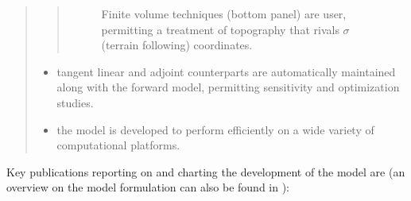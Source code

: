 \documentclass[letterpaper,10pt,english]{sphinxmanual}
\begin{document}
\begin{quote}
\begin{itemize}
\end{itemize}
\begin{quote}
\begin{figure}[htbp]
\centering
\capstart

\noindent{}
\caption{Finite volume techniques (bottom panel) are user, permitting a treatment of topography that rivals \(\sigma\) (terrain following) coordinates.}\label{\detokenize{overview/overview:fvol}}\end{figure}
\end{quote}
\begin{itemize}
\item {} 
tangent linear and adjoint counterparts are automatically maintained along with the forward model, permitting sensitivity and optimization studies.

\item {} 
the model is developed to perform efficiently on a wide variety of computational platforms.

\end{itemize}
\end{quote}

Key publications reporting on and charting the development of the model are \label{\detokenize{overview/overview:id1}}{\hyperref[\detokenize{zreferences:hill-95}]{\sphinxcrossref{{[}HM95{]}}}}\label{\detokenize{overview/overview:id2}}{\hyperref[\detokenize{zreferences:marshall-97a}]{\sphinxcrossref{{[}MHPA97{]}}}}\label{\detokenize{overview/overview:id3}}{\hyperref[\detokenize{zreferences:marshall-97b}]{\sphinxcrossref{{[}MAH+97{]}}}}\label{\detokenize{overview/overview:id4}}{\hyperref[\detokenize{zreferences:adcroft-97}]{\sphinxcrossref{{[}AHM97{]}}}}\label{\detokenize{overview/overview:id5}}{\hyperref[\detokenize{zreferences:mars-eta-98}]{\sphinxcrossref{{[}MJH98{]}}}}\label{\detokenize{overview/overview:id6}}{\hyperref[\detokenize{zreferences:adcroft-99}]{\sphinxcrossref{{[}AM99{]}}}}\label{\detokenize{overview/overview:id7}}{\hyperref[\detokenize{zreferences:hill-99}]{\sphinxcrossref{{[}CHM99{]}}}}\label{\detokenize{overview/overview:id8}}{\hyperref[\detokenize{zreferences:maro-eta-99}]{\sphinxcrossref{{[}MGZ+99{]}}}}\label{\detokenize{overview/overview:id9}}{\hyperref[\detokenize{zreferences:adcroft-04a}]{\sphinxcrossref{{[}AC04{]}}}}\label{\detokenize{overview/overview:id10}}{\hyperref[\detokenize{zreferences:adcroft-04b}]{\sphinxcrossref{{[}ACHM04{]}}}}\label{\detokenize{overview/overview:id11}}{\hyperref[\detokenize{zreferences:marshall-04}]{\sphinxcrossref{{[}MAC+04{]}}}} (an overview on the model formulation can also be found in \label{\detokenize{overview/overview:id12}}{\hyperref[\detokenize{zreferences:adcroft-04c}]{\sphinxcrossref{{[}AHC+04{]}}}}):
\end{document}
